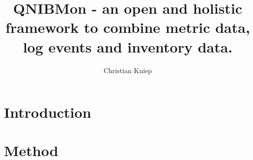 \documentclass[twocolumn,showpacs,%
  nofootinbib,aps,superscriptaddress,%
  eqsecnum,prd,notitlepage,showkeys,10pt]{revtex4-1}
\begin{document}
\title{QNIBMon - an open and holistic framework to combine metric data, log events and inventory data.}
\author{Christian Kniep}



\maketitle


\section{Introduction}


\section{Method}











\end{document}
